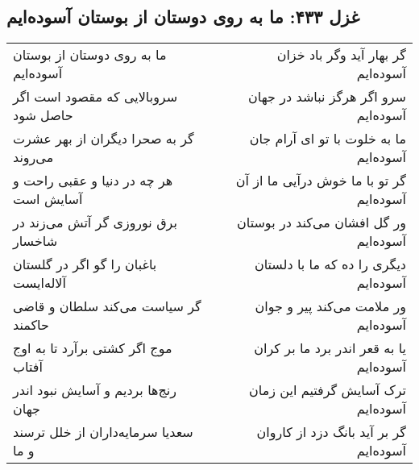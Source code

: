 \begin{center}
\section*{غزل ۴۳۳: ما به روی دوستان از بوستان آسوده‌ایم}
\label{sec:433}
\begin{longtable}{l p{0.5cm} r}
ما به روی دوستان از بوستان آسوده‌ایم
&&
گر بهار آید وگر باد خزان آسوده‌ایم
\\
سروبالایی که مقصود است اگر حاصل شود
&&
سرو اگر هرگز نباشد در جهان آسوده‌ایم
\\
گر به صحرا دیگران از بهر عشرت می‌روند
&&
ما به خلوت با تو ای آرام جان آسوده‌ایم
\\
هر چه در دنیا و عقبی راحت و آسایش است
&&
گر تو با ما خوش درآیی ما از آن آسوده‌ایم
\\
برق نوروزی گر آتش می‌زند در شاخسار
&&
ور گل افشان می‌کند در بوستان آسوده‌ایم
\\
باغبان را گو اگر در گلستان آلاله‌ایست
&&
دیگری را ده که ما با دلستان آسوده‌ایم
\\
گر سیاست می‌کند سلطان و قاضی حاکمند
&&
ور ملامت می‌کند پیر و جوان آسوده‌ایم
\\
موج اگر کشتی برآرد تا به اوج آفتاب
&&
یا به قعر اندر برد ما بر کران آسوده‌ایم
\\
رنج‌ها بردیم و آسایش نبود اندر جهان
&&
ترک آسایش گرفتیم این زمان آسوده‌ایم
\\
سعدیا سرمایه‌داران از خلل ترسند و ما
&&
گر بر آید بانگ دزد از کاروان آسوده‌ایم
\\
\end{longtable}
\end{center}
